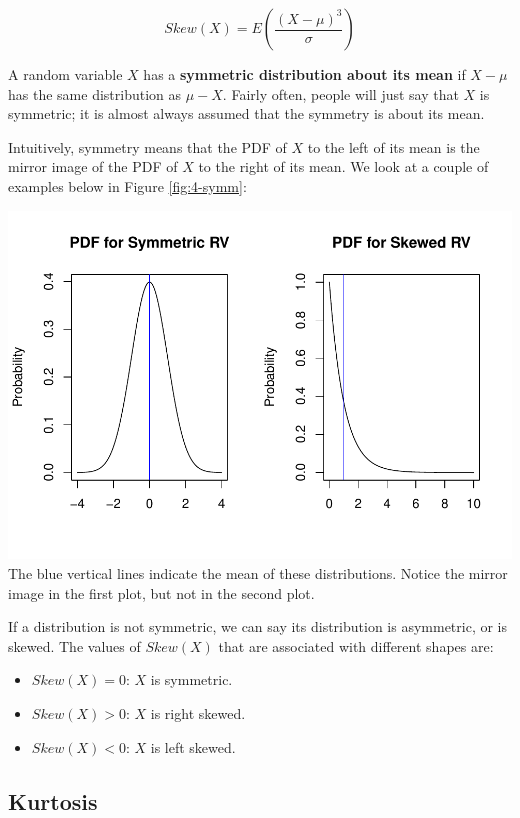 \documentclass[
]{book}
\providecommand{\tightlist}{%
  \setlength{\itemsep}{0pt}\setlength{\parskip}{0pt}}
\begin{document}
\begin{equation} 
Skew(X) = E \left(\frac{(X-\mu)^3}{\sigma} \right)
\label{eq:4-skew}
\end{equation}

A random variable \(X\) has a \textbf{symmetric distribution about its mean} if \(X - \mu\) has the same distribution as \(\mu - X\). Fairly often, people will just say that \(X\) is symmetric; it is almost always assumed that the symmetry is about its mean.

Intuitively, symmetry means that the PDF of \(X\) to the left of its mean is the mirror image of the PDF of \(X\) to the right of its mean. We look at a couple of examples below in Figure \ref{fig:4-symm}:

\includegraphics{bookdown-demo_files/figure-latex/4-symm-1.pdf}
The blue vertical lines indicate the mean of these distributions. Notice the mirror image in the first plot, but not in the second plot.

If a distribution is not symmetric, we can say its distribution is asymmetric, or is skewed. The values of \(Skew(X)\) that are associated with different shapes are:

\begin{itemize}
\tightlist
\item
  \(Skew(X) = 0\): \(X\) is symmetric.
\item
  \(Skew(X) > 0\): \(X\) is right skewed.
\item
  \(Skew(X) < 0\): \(X\) is left skewed.
\end{itemize}

\subsection{Kurtosis}\label{kurtosis}
\end{document}
